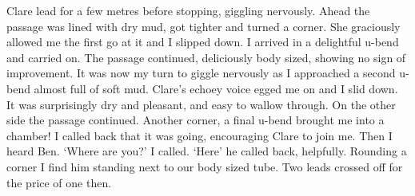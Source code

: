 Clare lead for a few metres before stopping, giggling nervously. Ahead the passage was lined with dry mud, got tighter and turned a corner. She graciously allowed me the first go at it and I slipped down. I arrived in a delightful u-bend and carried on. The passage continued, deliciously body sized, showing no sign of improvement. It was now my turn to giggle nervously as I approached a second u-bend almost full of soft mud. Clare's echoey voice egged me on and I slid down. It was surprisingly dry and pleasant, and easy to wallow through. On the other side the passage continued. Another corner, a final  u-bend brought me into a chamber! I called back that it was going, encouraging Clare to join me. Then I heard Ben. 
`Where are you?' I called. 
`Here' he called back, helpfully. 
Rounding a corner I find him standing next to our body sized tube. Two leads crossed off for the price of one then.
 
